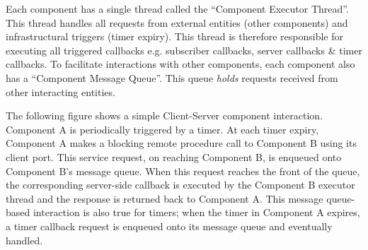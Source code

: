 \documentclass[letterpaper,10pt,english]{sphinxmanual}
\begin{document}
{\hfill{}\hfill}

Each component has a single thread called the ``Component Executor Thread''. This thread handles all requests from external entities (other components) and infrastructural triggers (timer expiry). This thread is therefore responsible for executing all triggered callbacks e.g. subscriber callbacks, server callbacks \& timer callbacks. To facilitate interactions with other components, each component also has a ``Component Message Queue''. This queue \emph{holds} requests received from other interacting entities.

The following figure shows a simple Client-Server component interaction. Component A is periodically triggered by a timer. At each timer expiry, Component A makes a blocking remote procedure call to Component B using its client port. This service request, on reaching Component B, is enqueued onto Component B's message queue. When this request reaches the front of the queue, the corresponding server-side callback is executed by the Component B executor thread and the response is returned back to Component A. This message queue-based interaction is also true for timers; when the timer in Component A expires, a timer callback request is enqueued onto its message queue and eventually handled.

{\hfill{}\hfill}
\end{document}
